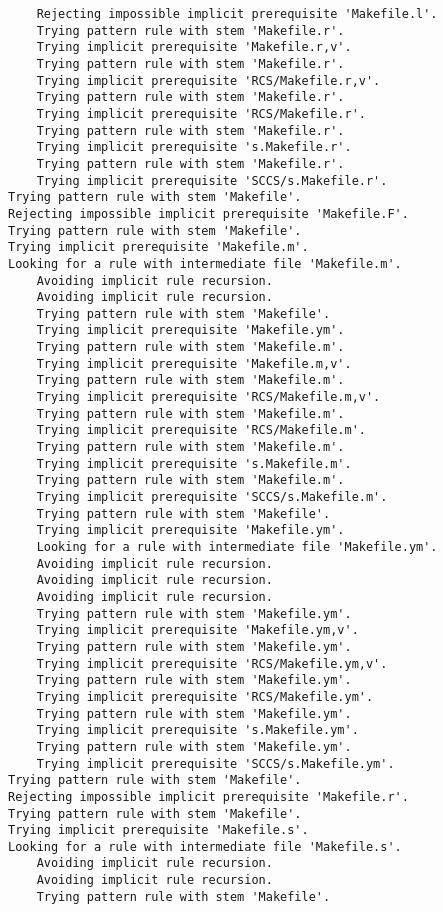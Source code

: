 \documentclass[11pt]{article}
\begin{document}
\begin{enumerate}
\begin{enumerate}
\begin{verbatim}
    Rejecting impossible implicit prerequisite 'Makefile.l'.
    Trying pattern rule with stem 'Makefile.r'.
    Trying implicit prerequisite 'Makefile.r,v'.
    Trying pattern rule with stem 'Makefile.r'.
    Trying implicit prerequisite 'RCS/Makefile.r,v'.
    Trying pattern rule with stem 'Makefile.r'.
    Trying implicit prerequisite 'RCS/Makefile.r'.
    Trying pattern rule with stem 'Makefile.r'.
    Trying implicit prerequisite 's.Makefile.r'.
    Trying pattern rule with stem 'Makefile.r'.
    Trying implicit prerequisite 'SCCS/s.Makefile.r'.
Trying pattern rule with stem 'Makefile'.
Rejecting impossible implicit prerequisite 'Makefile.F'.
Trying pattern rule with stem 'Makefile'.
Trying implicit prerequisite 'Makefile.m'.
Looking for a rule with intermediate file 'Makefile.m'.
    Avoiding implicit rule recursion.
    Avoiding implicit rule recursion.
    Trying pattern rule with stem 'Makefile'.
    Trying implicit prerequisite 'Makefile.ym'.
    Trying pattern rule with stem 'Makefile.m'.
    Trying implicit prerequisite 'Makefile.m,v'.
    Trying pattern rule with stem 'Makefile.m'.
    Trying implicit prerequisite 'RCS/Makefile.m,v'.
    Trying pattern rule with stem 'Makefile.m'.
    Trying implicit prerequisite 'RCS/Makefile.m'.
    Trying pattern rule with stem 'Makefile.m'.
    Trying implicit prerequisite 's.Makefile.m'.
    Trying pattern rule with stem 'Makefile.m'.
    Trying implicit prerequisite 'SCCS/s.Makefile.m'.
    Trying pattern rule with stem 'Makefile'.
    Trying implicit prerequisite 'Makefile.ym'.
    Looking for a rule with intermediate file 'Makefile.ym'.
    Avoiding implicit rule recursion.
    Avoiding implicit rule recursion.
    Avoiding implicit rule recursion.
    Trying pattern rule with stem 'Makefile.ym'.
    Trying implicit prerequisite 'Makefile.ym,v'.
    Trying pattern rule with stem 'Makefile.ym'.
    Trying implicit prerequisite 'RCS/Makefile.ym,v'.
    Trying pattern rule with stem 'Makefile.ym'.
    Trying implicit prerequisite 'RCS/Makefile.ym'.
    Trying pattern rule with stem 'Makefile.ym'.
    Trying implicit prerequisite 's.Makefile.ym'.
    Trying pattern rule with stem 'Makefile.ym'.
    Trying implicit prerequisite 'SCCS/s.Makefile.ym'.
Trying pattern rule with stem 'Makefile'.
Rejecting impossible implicit prerequisite 'Makefile.r'.
Trying pattern rule with stem 'Makefile'.
Trying implicit prerequisite 'Makefile.s'.
Looking for a rule with intermediate file 'Makefile.s'.
    Avoiding implicit rule recursion.
    Avoiding implicit rule recursion.
    Trying pattern rule with stem 'Makefile'.

\end{verbatim}
\end{enumerate}
\end{enumerate}
\end{document}
